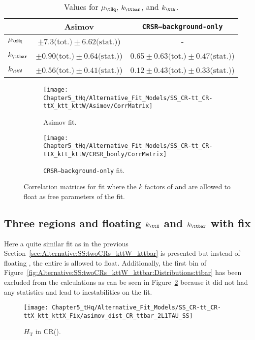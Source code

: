 \begin{table}[h]
\centering
\begin{tabular}{l|c|c}
\cline{2-3}
            		&   Asimov								&  \texttt{CRSR--background-only}       			\\ \midrule
$\mu_{\tHq}$ 	&  $\pm 7.3\text{(tot.)} \pm 6.62\text{(stat.)}$)        	&        -        \\
$k_{\ttbar}$	&  $\pm 0.90\text{(tot.)} \pm 0.64\text{(stat.)}$) 		&  $0.65\pm 0.63\text{(tot.)} \pm 0.47\text{(stat.)}$)  \\
$k_{\ttW}$ 	&  $\pm 0.56\text{(tot.)} \pm 0.41\text{(stat.)}$)		&  $0.12\pm 0.43\text{(tot.)} \pm 0.33\text{(stat.)}$)        \\ \bottomrule
\end{tabular}
\caption{Values for $\mu_{\tHq}$, $k_{\ttbar}$, and $k_{\ttW}$.}
\label{tab:Alternative:SS:twoCRs_kttW_kttbar:results} 
\end{table}



\begin{figure}[h]
\centering
\begin{subfigure}{.5\textwidth}
  \centering
  \texttt{[image: Chapter5\_tHq/Alternative\_Fit\_Models/SS\_CR-tt\_CR-ttX\_ktt\_kttW/Asimov/CorrMatrix]}
  \caption{Asimov fit.}
\end{subfigure}%
\begin{subfigure}{.5\textwidth}
  \centering
  \texttt{[image: Chapter5\_tHq/Alternative\_Fit\_Models/SS\_CR-tt\_CR-ttX\_ktt\_kttW/CRSR\_bonly/CorrMatrix]}
  \caption{\texttt{CRSR--background-only} fit.}
\end{subfigure}
\caption{Correlation matrices for \dilepSStau fit where the $k$ factors of \ttbar and \ttW are allowed to float as  free parameters of the fit.}
\label{fig:Alternative:SS:twoCRs_kttW_kttbar:matrices}
\end{figure}


\FloatBarrier

\subsection{Three regions and floating $k_{\ttX}$ and $k_{\ttbar}$ with fix}
\label{sec:Alternative:SS:twoCRs_kttW_kttbar_Fixed}
Here a quite similar fit as in the previous Section~\ref{sec:Alternative:SS:twoCRs_kttW_kttbar} is presented but
instead of floating \ttW, the entire \ttX is allowed to float. Additionally,  
the first bin of Figure~\ref{fig:Alternative:SS:twoCRs_kttW_kttbar:Distributions:ttbar} has been excluded from 
the calculations as can be seen in Figure~\ref{fig:Alternative:SS:twoCRs_kttX_kttbar_fixed:Distribution} because
it did not had any statistics and lead to inestabilities on the fit.
\begin{figure}[h!]
  \centering  
    \texttt{[image: Chapter5\_tHq/Alternative\_Fit\_Models/SS\_CR-tt\_CR-ttX\_ktt\_kttX\_Fix/asimov\_dist\_CR\_ttbar\_2L1TAU\_SS]}
  \caption{$H_{\text{T}}$ in CR(\ttbar).} 
  \label{fig:Alternative:SS:twoCRs_kttX_kttbar_fixed:Distribution}
\end{figure}
 
